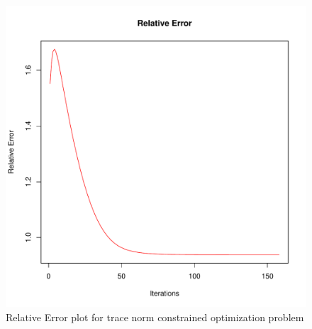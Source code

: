 \documentclass[12pt, leqno]{article}
\begin{document}
\begin{figure}
\begin{center}
                \includegraphics[scale = 0.4]{takehome3error.pdf}
                \caption{Relative Error plot for trace norm
                  constrained optimization problem}
                \label{fig:no3error}
\end{center}
\end{figure}
\end{document}
